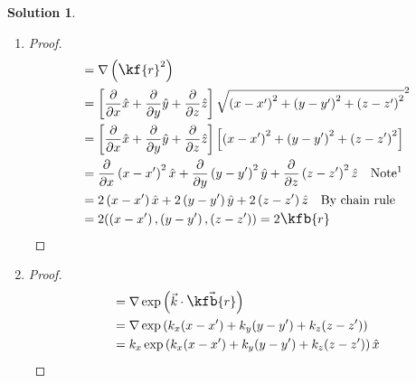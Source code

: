 \documentclass[10pt]{article}
\theoremstyle{definition}
\newtheorem{soln}{Solution}
\newcommand{\ux}{\hat{x}}
\newcommand{\uy}{\hat{y}}
\newcommand{\uz}{\hat{z}}
\newcommand{\primed}[1]{#1^\prime}
\newcommand{\scriptr}{\fontsize{12pt}{12pt}\kf{r}}
\newcommand{\bscriptr}{\fontsize{12pt}{12pt}\kfb{r}}
\begin{document}
\begin{soln} ~
  \begin{enumerate}[label=(\alph*)]
    \item \begin{proof}
            \begin{align*}
               & =\nabla\left(\scriptr^2\right)                                                                                                                                                                                     \\
               & =\left[\frac{\partial}{\partial x}\ux + \frac{\partial}{\partial y}\uy + \frac{\partial}{\partial z}\uz \right]\sqrt{\left(x-\primed{x}\right)^2 + \left(y-\primed{y}\right)^2+ \left(z-\primed{z}\right)^2}^2     \\
               & =\left[\frac{\partial}{\partial x}\ux + \frac{\partial}{\partial y}\uy + \frac{\partial}{\partial z}\uz \right]\left[\left(x-\primed{x}\right)^2 + \left(y-\primed{y}\right)^2+ \left(z-\primed{z}\right)^2\right] \\
               & =\frac{\partial}{\partial x}\left(x-\primed{x}\right)^2\ux + \frac{\partial}{\partial y} \left(y-\primed{y}\right)^2\uy + \frac{\partial}{\partial z}\left(z-\primed{z}\right)^2\uz \quad \text{Note\footnotemark} \\
               & =2\left(x-\primed{x}\right)\ux + 2\left(y-\primed{y}\right)\uy+2\left(z-\primed{z}\right)\uz \quad \text{By chain rule}                                                                                            \\
               & =2(\left(x-\primed{x}\right),\left(y-\primed{y}\right),\left(z-\primed{z}\right)) = 2\bscriptr\qedhere
            \end{align*}
          \end{proof}
    \item \begin{proof}
            \begin{align*}
               & =  \nabla\exp\left(\vec{k}\cdot\vec{\bscriptr}\right)                                   \\
               & =  \nabla\exp\left(k_x(x-\primed{x})+k_y(y-\primed{y})+k_z(z-\primed{z})\right)         \\
               & = k_x\exp\left(k_x(x-\primed{x})+k_y(y-\primed{y})+k_z(z-\primed{z})\right)\ux          \\

\end{align*}
\end{proof}
\end{enumerate}
\end{soln}
\end{document}
